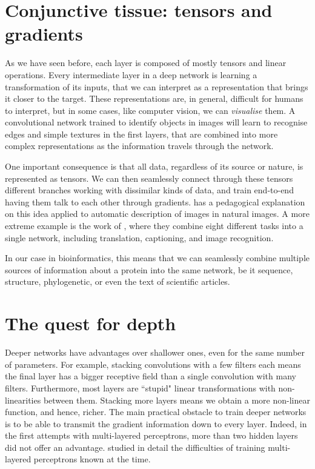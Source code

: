 \section[Tensors and gradients]{Conjunctive tissue: tensors and gradients}\label{sec:tensors}
As we have seen before, each layer is composed of mostly tensors and linear operations.
Every intermediate layer in a deep network is learning a transformation of its inputs, that we can interpret as a representation that brings it closer to the target.
These representations are, in general, difficult for humans to interpret, but in some cases, like computer vision, we can \emph{visualise} them.
A convolutional network trained to identify objects in images will learn to recognise edges and simple textures in the first layers, that are combined into more complex representations as the information travels through the network.

One important consequence is that all data, regardless of its source or nature, is represented as tensors.
We can then seamlessly connect through these tensors different branches working with dissimilar kinds of data, and train end-to-end having them talk to each other through gradients.
\citet{tensors_and_gradients} has a pedagogical explanation on this idea applied to automatic description of images in natural images.
A more extreme example is the work of \citet{one_rule_all}, where they combine eight different tasks into a single network, including translation, captioning, and image recognition.

In our case in bioinformatics, this means that we can seamlessly combine multiple sources of information about a protein into the same network, be it sequence, structure, phylogenetic, or even the text of scientific articles.

\section{The quest for depth}\label{sec:depth}
Deeper networks have advantages over shallower ones, even for the same number of parameters.
For example, stacking convolutions with a few filters each means the final layer has a bigger receptive field than a single convolution with many filters.
Furthermore, most layers are ``stupid" linear transformations with non-linearities between them.
Stacking more layers means we obtain a more non-linear function, and hence, richer.
The main practical obstacle to train deeper networks is to be able to transmit the gradient information down to every layer.
Indeed, in the first attempts with multi-layered perceptrons, more than two hidden layers did not offer an advantage.
\citet{glorot} studied in detail the difficulties of training multi-layered perceptrons known at the time.

